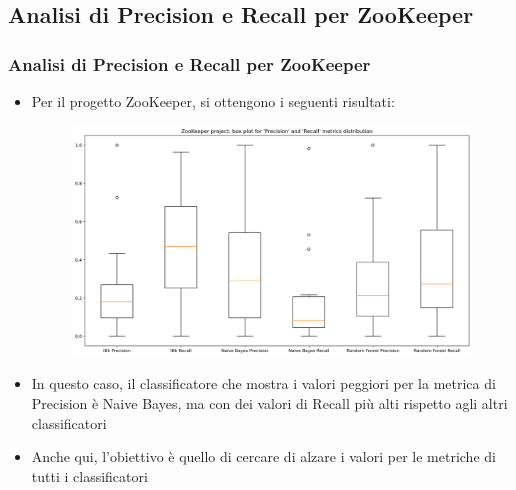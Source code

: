 \documentclass[10pt]{beamer}
\begin{document}
\begin{frame}
\section{Analisi di Precision e Recall per ZooKeeper}
\frametitle{Analisi di Precision e Recall per ZooKeeper}
\begin{itemize}
\item Per il progetto ZooKeeper, si ottengono i seguenti risultati:
\begin{figure}
\includegraphics[scale=0.25]{images/pr_rc_base_zk}
\end{figure}
\item In questo caso, il classificatore che mostra i valori peggiori per la metrica di Precision è Naive Bayes, ma con dei valori di Recall più alti rispetto agli altri classificatori
\item Anche qui, l'obiettivo è quello di cercare di alzare i valori per le metriche di tutti i classificatori
\end{itemize}
\end{frame}
\end{document}

